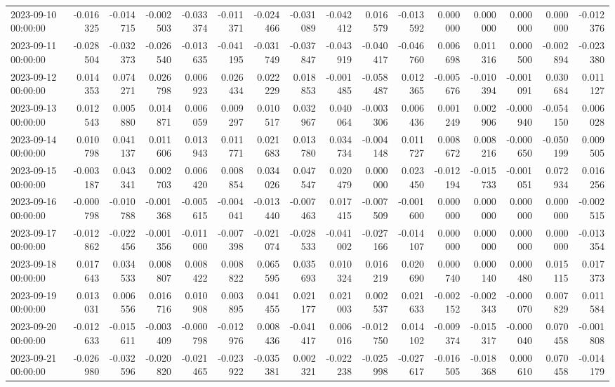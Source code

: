 \begin{tabular}{lrrrrrrrrrrrrrrr}
2023-09-10 00:00:00 & -0.016325 & -0.014715 & -0.002503 & -0.033374 & -0.011371 & -0.024466 & -0.031089 & -0.042412 & 0.016579 & -0.013592 & 0.000000 & 0.000000 & 0.000000 & 0.000000 & -0.012376 \\
2023-09-11 00:00:00 & -0.028504 & -0.032373 & -0.026540 & -0.013635 & -0.041195 & -0.031749 & -0.037847 & -0.043919 & -0.040417 & -0.046760 & 0.006698 & 0.011316 & 0.000500 & -0.002894 & -0.023380 \\
2023-09-12 00:00:00 & 0.014353 & 0.074271 & 0.026798 & 0.006923 & 0.026434 & 0.022229 & 0.018853 & -0.001485 & -0.058487 & 0.012365 & -0.005676 & -0.010394 & -0.001091 & 0.030684 & 0.011127 \\
2023-09-13 00:00:00 & 0.012543 & 0.005880 & 0.014871 & 0.006059 & 0.009297 & 0.010517 & 0.032967 & 0.040064 & -0.003306 & 0.006436 & 0.001249 & 0.002906 & -0.000940 & -0.054150 & 0.006028 \\
2023-09-14 00:00:00 & 0.010798 & 0.041137 & 0.011606 & 0.013943 & 0.011771 & 0.021683 & 0.013780 & 0.034734 & -0.004148 & 0.011727 & 0.008672 & 0.008216 & -0.000650 & -0.050199 & 0.009505 \\
2023-09-15 00:00:00 & -0.003187 & 0.043341 & 0.002703 & 0.006420 & 0.008854 & 0.034026 & 0.047547 & 0.020479 & 0.000000 & 0.023450 & -0.012194 & -0.015733 & -0.001051 & 0.072934 & 0.016256 \\
2023-09-16 00:00:00 & -0.000798 & -0.010788 & -0.001368 & -0.005615 & -0.004041 & -0.013440 & -0.007463 & 0.017415 & -0.007509 & -0.001600 & 0.000000 & 0.000000 & 0.000000 & 0.000000 & -0.002515 \\
2023-09-17 00:00:00 & -0.012862 & -0.022456 & -0.001356 & -0.011000 & -0.007398 & -0.021074 & -0.028533 & -0.041002 & -0.027166 & -0.014107 & 0.000000 & 0.000000 & 0.000000 & 0.000000 & -0.013354 \\
2023-09-18 00:00:00 & 0.017643 & 0.034533 & 0.008807 & 0.008422 & 0.008822 & 0.065595 & 0.035693 & 0.010324 & 0.016219 & 0.020690 & 0.000740 & 0.000140 & 0.000480 & 0.015115 & 0.017373 \\
2023-09-19 00:00:00 & 0.013031 & 0.006556 & 0.016716 & 0.010908 & 0.003895 & 0.041455 & 0.021177 & 0.021003 & 0.002537 & 0.021633 & -0.002152 & -0.002343 & -0.000070 & 0.007829 & 0.011584 \\
2023-09-20 00:00:00 & -0.012633 & -0.015611 & -0.003409 & -0.000798 & -0.012976 & 0.008436 & -0.041417 & 0.006016 & -0.012750 & 0.014102 & -0.009374 & -0.015317 & -0.000040 & 0.070458 & -0.001808 \\
2023-09-21 00:00:00 & -0.026980 & -0.032596 & -0.020820 & -0.021465 & -0.023922 & -0.035381 & 0.002321 & -0.022238 & -0.025998 & -0.027617 & -0.016505 & -0.018368 & 0.000610 & 0.070458 & -0.014179 \\

\end{tabular}
